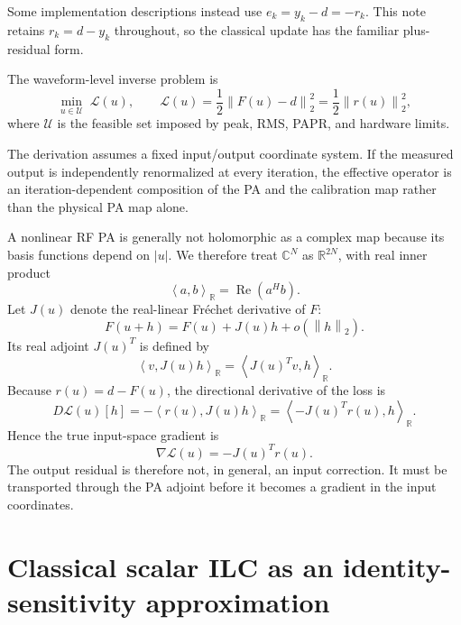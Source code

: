 \documentclass[10pt,a4paper]{article}
\newcommand{\Rinner}[2]{\left\langle #1,#2\right\rangle_{\mathbb R}}
\newcommand{\norm}[1]{\left\lVert #1\right\rVert_2}
\begin{document}
Some implementation descriptions instead use $e_k=y_k-d=-r_k$. This note retains $r_k=d-y_k$
throughout, so the classical update has the familiar plus-residual form.

The waveform-level inverse problem is
\begin{equation}
  \min_{u\in\mathcal U}\;\mathcal L(u),
  \qquad
  \mathcal L(u)
  =\frac12\norm{F(u)-d}^{2}
  =\frac12\norm{r(u)}^{2},
  \label{eq:inverse-problem}
\end{equation}
where $\mathcal U$ is the feasible set imposed by peak, RMS, PAPR, and hardware limits.

The derivation assumes a fixed input/output coordinate system. If the measured output is independently
renormalized at every iteration, the effective operator is an iteration-dependent composition of the PA and
the calibration map rather than the physical PA map alone.

A nonlinear RF PA is generally not holomorphic as a complex map because its basis functions depend on
$|u|$. We therefore treat $\mathbb C^N$ as $\mathbb R^{2N}$, with real inner product
\begin{equation}
  \Rinner{a}{b}=\operatorname{Re}(a^H b).
  \label{eq:real-inner-product}
\end{equation}
Let $J(u)$ denote the real-linear Fr\'echet derivative of $F$:
\begin{equation}
  F(u+h)=F(u)+J(u)h+o(\norm{h}).
\end{equation}
Its real adjoint $J(u)^T$ is defined by
\begin{equation}
  \Rinner{v}{J(u)h}=\Rinner{J(u)^T v}{h}.
  \label{eq:real-adjoint}
\end{equation}
Because $r(u)=d-F(u)$, the directional derivative of the loss is
\begin{equation}
  D\mathcal L(u)[h]
  =-\Rinner{r(u)}{J(u)h}
  =\Rinner{-J(u)^T r(u)}{h}.
\end{equation}
Hence the true input-space gradient is
\begin{equation}
  \boxed{\nabla\mathcal L(u)=-J(u)^T r(u).}
  \label{eq:true-gradient}
\end{equation}
The output residual is therefore not, in general, an input correction. It must be transported through the
PA adjoint before it becomes a gradient in the input coordinates.

\section{Classical scalar ILC as an identity-sensitivity approximation}
\end{document}
